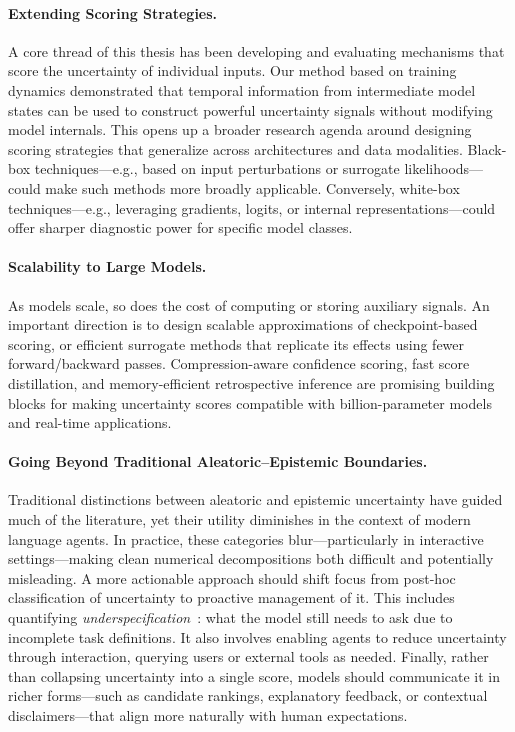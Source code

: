 \paragraph{Extending Scoring Strategies.} A core thread of this thesis has been developing and evaluating mechanisms that score the uncertainty of individual inputs. Our method based on training dynamics demonstrated that temporal information from intermediate model states can be used to construct powerful uncertainty signals without modifying model internals. This opens up a broader research agenda around designing scoring strategies that generalize across architectures and data modalities. Black-box techniques—e.g., based on input perturbations or surrogate likelihoods—could make such methods more broadly applicable. Conversely, white-box techniques—e.g., leveraging gradients, logits, or internal representations—could offer sharper diagnostic power for specific model classes.

\paragraph{Scalability to Large Models.} As models scale, so does the cost of computing or storing auxiliary signals. An important direction is to design scalable approximations of checkpoint-based scoring, or efficient surrogate methods that replicate its effects using fewer forward/backward passes. Compression-aware confidence scoring, fast score distillation, and memory-efficient retrospective inference are promising building blocks for making uncertainty scores compatible with billion-parameter models and real-time applications.

\paragraph{Going Beyond Traditional Aleatoric--Epistemic Boundaries.} Traditional distinctions between aleatoric and epistemic uncertainty have guided much of the literature, yet their utility diminishes in the context of modern language agents. In practice, these categories blur—particularly in interactive settings—making clean numerical decompositions both difficult and potentially misleading. A more actionable approach should shift focus from post-hoc classification of uncertainty to proactive management of it. This includes quantifying \textit{underspecification}~\citep{kirchhof2025position}: what the model still needs to ask due to incomplete task definitions. It also involves enabling agents to reduce uncertainty through interaction, querying users or external tools as needed. Finally, rather than collapsing uncertainty into a single score, models should communicate it in richer forms—such as candidate rankings, explanatory feedback, or contextual disclaimers—that align more naturally with human expectations.

